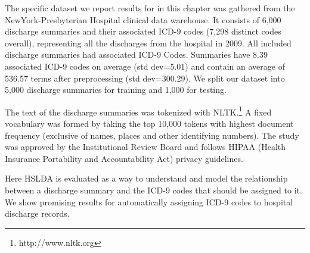 
The specific dataset we report results for in this chapter was gathered from the NewYork-Presbyterian Hospital clinical data warehouse. 
It consists of 6,000 discharge summaries and
their associated ICD-9 codes (7,298 distinct codes overall), representing all
the discharges from the hospital in 2009. All included discharge summaries had associated ICD-9 Codes.
Summaries have 8.39 associated ICD-9
codes on average (std dev=5.01) and contain an average of 536.57 terms after
preprocessing (std dev=300.29). We split our dataset into 5,000 discharge
summaries for training and 1,000 for testing.

The text of the discharge summaries was tokenized with
NLTK.\footnote{http://www.nltk.org} A fixed vocabulary was formed by taking
the top 10,000 tokens with highest document frequency (exclusive of names,
places and other identifying numbers). The study was approved
by the Institutional Review Board and follows HIPAA (Health
Insurance Portability and Accountability Act) privacy guidelines.

Here HSLDA is evaluated as a way to understand and model the relationship between a discharge summary and the ICD-9 codes that should be assigned to it.  We show promising results for automatically assigning ICD-9 codes to hospital discharge records.  


